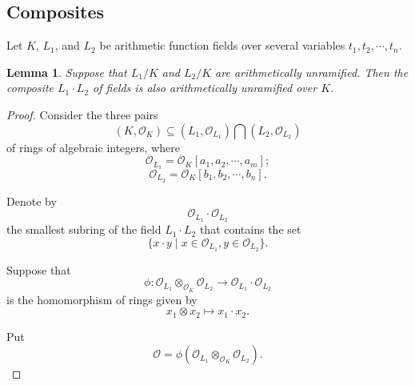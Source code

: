 \documentclass{amsart}
\newtheorem{lemma}[theorem]{Lemma}
\theoremstyle{definition}
\numberwithin{equation}{section}
\begin{document}
\subsection{Composites}

Let $K$, $L_{1}$, and $L_{2}$ be arithmetic function fields over several variables $
t_{1},t_{2},\cdots, t_{n}$.

\begin{lemma}
Suppose that $L_{1}/K$ and $L_{2}/K$ are
arithmetically unramified. Then the composite $L_{1}\cdot L_{2}$ of fields is also arithmetically unramified over $K$.
\end{lemma}

\begin{proof}
Consider the three pairs
\begin{equation*}
(K,\mathcal{O}_{K})\subseteq (L_{1},\mathcal{O}_{L_{1}})\bigcap (L_{2},
\mathcal{O}_{L_{2}})
\end{equation*}
of rings of algebraic integers, where
\begin{equation*}
\mathcal{O}_{L_{1}}=\mathcal{O}_{K}[a_{1},a_{2},\cdots, a_{m}];
\end{equation*}
\begin{equation*}
\mathcal{O}_{L_{2}}=\mathcal{O}_{K}[b_{1},b_{2},\cdots, b_{n}].
\end{equation*}

Denote by
\begin{equation*}
\mathcal{O}_{L_{1}}\cdot \mathcal{O}_{L_{2}}
\end{equation*}
the smallest subring of the field ${L_{1}}\cdot {L_{2}}$ that contains the
set
\begin{equation*}
\{x\cdot y\mid x\in \mathcal{O}_{L_{1}},y\in \mathcal{O}_{L_{2}}\}.
\end{equation*}

Suppose that
\begin{equation*}
\phi:\mathcal{O}_{L_{1}}\otimes _{\mathcal{O}_{K}} \mathcal{O} _{L_{2}}\to
\mathcal{O}_{L_{1}}\cdot \mathcal{O}_{L_{2}}
\end{equation*}
is the homomorphism of rings given by
\begin{equation*}
x_{1}\otimes x_{2}\mapsto x_{1}\cdot x_{2}.
\end{equation*}

Put
\begin{equation*}
\mathcal{O}=\phi(\mathcal{O}_{L_{1}}\otimes _{\mathcal{O}_{K}} \mathcal{O}
_{L_{2}}).
\end{equation*}


\end{proof}
\end{document}
